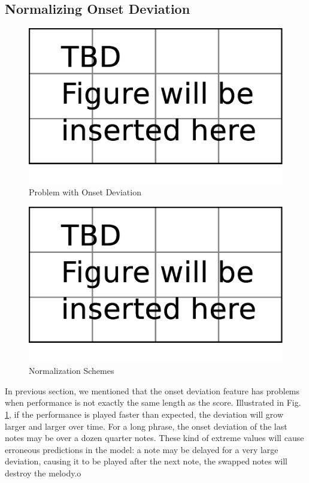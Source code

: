    \subsection{Normalizing Onset Deviation}
   \label{sec:normalize}
\begin{figure}[tp]
   \begin{center}
      \includegraphics[width=\textwidth]{fig/TBDFigure}

   \end{center}
   \caption{Problem with Onset Deviation }
   \label{fig:normalizationprob}
\end{figure}
\begin{figure}[tp]
   \begin{center}
      \includegraphics[width=\textwidth]{fig/TBDFigure}

   \end{center}
   \caption{Normalization Schemes}
   \label{fig:normalization}
\end{figure}
In previous section, we mentioned that the onset deviation feature has problems when performance is not exactly the same length as the score. Illustrated in Fig. \ref{fig:normalizationprob}, if the performance is played faster than expected, the deviation will grow larger and larger over time. For a long phrase, the onset deviation of the last notes may be over a dozen quarter notes. These kind of extreme values will cause erroneous predictions in the model: a note may be delayed for a very large deviation, causing it to be played after the next note, the swapped notes will destroy the melody.o
 
